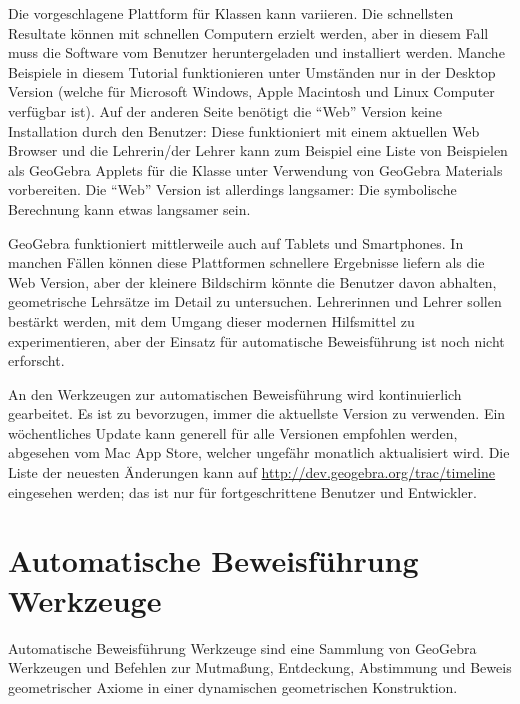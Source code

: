 \documentclass{article}
\begin{document}
Die vorgeschlagene Plattform für Klassen kann variieren. Die schnellsten Resultate können mit schnellen Computern erzielt werden, aber in diesem Fall muss die Software vom Benutzer heruntergeladen und installiert werden. Manche Beispiele in diesem Tutorial funktionieren unter Umständen nur in der \glqq{}Desktop\grqq{} Version (welche für Microsoft Windows, Apple Macintosh und Linux Computer verfügbar ist). Auf der anderen Seite benötigt die ``Web'' Version keine Installation durch den Benutzer: Diese funktioniert mit einem aktuellen Web Browser und die Lehrerin/der Lehrer kann zum Beispiel eine Liste von Beispielen als GeoGebra Applets für die Klasse unter Verwendung von GeoGebra Materials vorbereiten. Die ``Web'' Version ist allerdings langsamer: Die symbolische Berechnung kann etwas langsamer sein.

GeoGebra funktioniert mittlerweile auch auf Tablets und Smartphones. In manchen Fällen können diese Plattformen schnellere Ergebnisse liefern als die Web Version, aber der kleinere Bildschirm könnte die Benutzer davon abhalten, geometrische Lehrsätze im Detail zu untersuchen. Lehrerinnen und Lehrer sollen bestärkt werden, mit dem Umgang dieser modernen Hilfsmittel zu experimentieren, aber der Einsatz für automatische Beweisführung ist noch nicht erforscht.

An den Werkzeugen zur automatischen Beweisführung wird kontinuierlich gearbeitet. Es ist zu bevorzugen, immer die aktuellste Version zu verwenden. Ein wöchentliches Update kann generell für alle Versionen empfohlen werden, abgesehen vom Mac App Store, welcher ungefähr monatlich aktualisiert wird. Die Liste der neuesten Änderungen kann auf \url{http://dev.geogebra.org/trac/timeline} eingesehen werden; das ist nur für fortgeschrittene Benutzer und Entwickler. 

\section{Automatische Beweisführung Werkzeuge}

Automatische Beweisführung Werkzeuge sind eine Sammlung von GeoGebra Werkzeugen und Befehlen zur Mutmaßung, Entdeckung, Abstimmung und Beweis geometrischer Axiome in einer dynamischen geometrischen Konstruktion.
\end{document}
